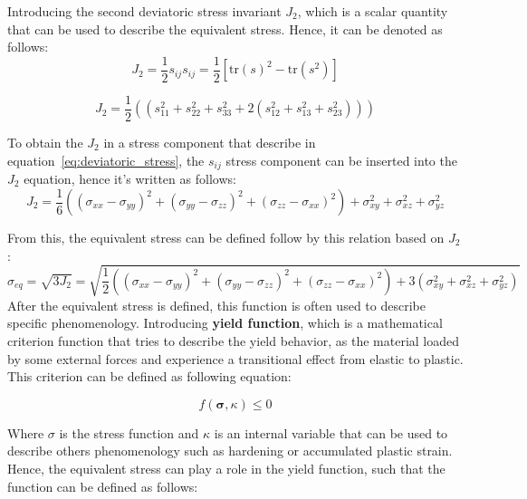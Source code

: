 \documentclass[12pt]{article}
\begin{document}
Introducing the second deviatoric stress invariant $J_2$, which is a scalar quantity that can be used to describe the equivalent stress.
Hence, it can be denoted as follows:
\begin{equation}
J_2 = \frac{1}{2}s_{ij}s_{ij} = \frac{1}{2}[\text{tr}(s)^2-\text{tr}(s^2)]
\end{equation}

\begin{equation}
    J_2 = \frac{1}{2} \left((s_{11}^2 + s_{22}^2 + s_{33}^2 + 2(s_{12}^2 + s_{13}^2 + s_{23}^2)) \right)
\end{equation}

To obtain the $J_2$ in a stress component that describe in equation~\ref{eq:deviatoric_stress}, 
the $s_{ij}$ stress component can be inserted into the $J_2$ equation, hence it's written as follows:
\begin{equation}
    J_2 = \frac{1}{6} \left( (\sigma_{xx} - \sigma_{yy})^2 + (\sigma_{yy} - \sigma_{zz})^2 + (\sigma_{zz} - \sigma_{xx})^2 \right) + \sigma_{xy}^2 + \sigma_{xz}^2 + \sigma_{yz}^2
\end{equation}

From this, the equivalent stress can be defined follow by this relation based on $J_2$:
\begin{equation}
    \sigma_{eq} = \sqrt{3J_2} = \sqrt{\frac{1}{2} \left( (\sigma_{xx} - \sigma_{yy})^2 + (\sigma_{yy} - \sigma_{zz})^2 + (\sigma_{zz} - \sigma_{xx})^2 \right) + 3(\sigma_{xy}^2 + \sigma_{xz}^2 + \sigma_{yz}^2)}
\end{equation}
\hspace{2em}After the equivalent stress is defined, this function is often used to describe specific phenomenology.
Introducing \textbf{yield function}, which is a mathematical criterion function that tries to describe the yield behavior,
as the material loaded by some external forces and experience a transitional effect from elastic to plastic. This criterion 
can be defined as following equation:

\begin{equation}
    f(\boldsymbol{\sigma}, \kappa) \leq 0
\end{equation}

\hspace{2em}Where $\sigma$ is the stress function and $\kappa$ is
an internal variable that can be used to describe others phenomenology such as hardening or 
accumulated plastic strain. Hence, the equivalent stress can play a role in the yield function, such
that the function can be defined as follows: 
\end{document}
